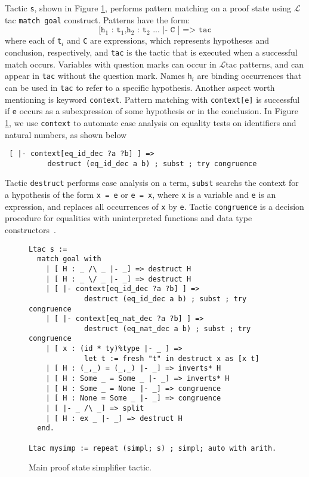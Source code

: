Tactic \texttt{s}, shown in Figure \ref{simptac}, performs pattern
matching on a proof state using $\mathcal{L}$tac \texttt{match goal}
construct. Patterns have the form:
\[ \texttt{[h$_1$ : t$_1$,h$_2$ : t$_2$ ... |- C ] => tac}\] 
where each of \texttt{t}$_i$ and \texttt{C} are expressions, which
represents hypotheses and conclusion, respectively, and \texttt{tac}
is the tactic that is executed when a successful match
occurs. Variables with question marks can occur in $\mathcal{L}$tac
patterns, and can appear in \texttt{tac} without the question
mark. Names \texttt{h}$_i$ are binding occurrences that can be used in
\texttt{tac} to refer to a specific hypothesis. Another aspect
worth mentioning is keyword \texttt{context}. Pattern matching with
\texttt{context[e]} is successful if \texttt{e} occurs as a
subexpression of some hypothesis or in the conclusion. In Figure
\ref{simptac}, we use \texttt{context} to automate case analysis on
equality tests on identifiers and natural numbers, as shown below
\begin{lstlisting}
 [ |- context[eq_id_dec ?a ?b] ] => 
          destruct (eq_id_dec a b) ; subst ; try congruence
\end{lstlisting}
Tactic \texttt{destruct} performs case analysis on a term,
\texttt{subst} searchs the context for a hypothesis of the form
\texttt{x = e} or \texttt{e = x}, where \texttt{x} is a variable and
\texttt{e} is an expression, and replaces all occurrences of
\texttt{x} by \texttt{e}. Tactic \texttt{congruence} is a decision
procedure for equalities with uninterpreted functions and data type
constructors~\cite{Bertot04}.
\begin{figure}[H]
\begin{lstlisting}
Ltac s :=
  match goal with
    | [ H : _ /\ _ |- _] => destruct H
    | [ H : _ \/ _ |- _] => destruct H
    | [ |- context[eq_id_dec ?a ?b] ] => 
             destruct (eq_id_dec a b) ; subst ; try congruence
    | [ |- context[eq_nat_dec ?a ?b] ] => 
             destruct (eq_nat_dec a b) ; subst ; try congruence
    | [ x : (id * ty)%type |- _ ] => 
             let t := fresh "t" in destruct x as [x t]
    | [ H : (_,_) = (_,_) |- _] => inverts* H
    | [ H : Some _ = Some _ |- _] => inverts* H
    | [ H : Some _ = None |- _] => congruence
    | [ H : None = Some _ |- _] => congruence
    | [ |- _ /\ _] => split
    | [ H : ex _ |- _] => destruct H
  end.

Ltac mysimp := repeat (simpl; s) ; simpl; auto with arith.
\end{lstlisting}
\caption{Main proof state simplifier tactic.}
\label{simptac}
\end{figure}

